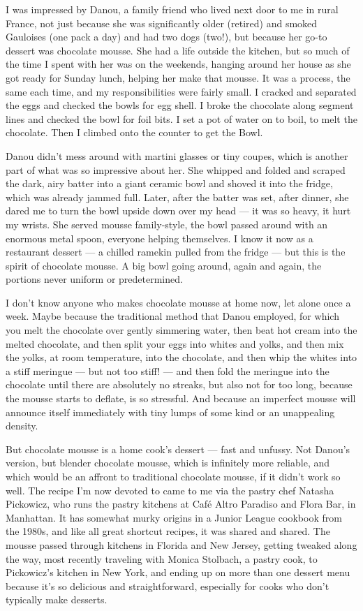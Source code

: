 I was impressed by Danou, a family friend who lived next door to me in
rural France, not just because she was significantly older (retired) and
smoked Gauloises (one pack a day) and had two dogs (two!), but because
her go-to dessert was chocolate mousse. She had a life outside the
kitchen, but so much of the time I spent with her was on the weekends,
hanging around her house as she got ready for Sunday lunch, helping her
make that mousse. It was a process, the same each time, and my
responsibilities were fairly small. I cracked and separated the eggs and
checked the bowls for egg shell. I broke the chocolate along segment
lines and checked the bowl for foil bits. I set a pot of water on to
boil, to melt the chocolate. Then I climbed onto the counter to get the
Bowl.

Danou didn't mess around with martini glasses or tiny coupes, which is
another part of what was so impressive about her. She whipped and folded
and scraped the dark, airy batter into a giant ceramic bowl and shoved
it into the fridge, which was already jammed full. Later, after the
batter was set, after dinner, she dared me to turn the bowl upside down
over my head --- it was so heavy, it hurt my wrists. She served mousse
family-style, the bowl passed around with an enormous metal spoon,
everyone helping themselves. I know it now as a restaurant dessert --- a
chilled ramekin pulled from the fridge --- but this is the spirit of
chocolate mousse. A big bowl going around, again and again, the portions
never uniform or predetermined.

I don't know anyone who makes chocolate mousse at home now, let alone
once a week. Maybe because the traditional method that Danou employed,
for which you melt the chocolate over gently simmering water, then beat
hot cream into the melted chocolate, and then split your eggs into
whites and yolks, and then mix the yolks, at room temperature, into the
chocolate, and then whip the whites into a stiff meringue --- but not
too stiff! --- and then fold the meringue into the chocolate until there
are absolutely no streaks, but also not for too long, because the mousse
starts to deflate, is so stressful. And because an imperfect mousse will
announce itself immediately with tiny lumps of some kind or an
unappealing density.

But chocolate mousse is a home cook's dessert --- fast and unfussy. Not
Danou's version, but blender chocolate mousse, which is infinitely more
reliable, and which would be an affront to traditional chocolate mousse,
if it didn't work so well. The recipe I'm now devoted to came to me via
the pastry chef Natasha Pickowicz, who runs the pastry kitchens at Café
Altro Paradiso and Flora Bar, in Manhattan. It has somewhat murky
origins in a Junior League cookbook from the 1980s, and like all great
shortcut recipes, it was shared and shared. The mousse passed through
kitchens in Florida and New Jersey, getting tweaked along the way, most
recently traveling with Monica Stolbach, a pastry cook, to Pickowicz's
kitchen in New York, and ending up on more than one dessert menu because
it's so delicious and straightforward, especially for cooks who don't
typically make desserts.

